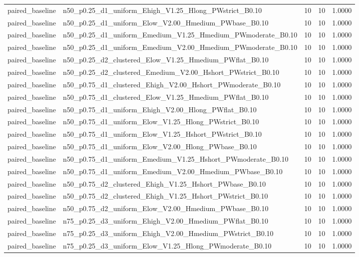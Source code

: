 \begin{tabular}{llrrr}
paired_baseline & n50_p0.25_d1_uniform_Ehigh_V1.25_Hlong_PWstrict_B0.10 & 10 & 10 & 1.0000 \\
paired_baseline & n50_p0.25_d1_uniform_Elow_V2.00_Hmedium_PWbase_B0.10 & 10 & 10 & 1.0000 \\
paired_baseline & n50_p0.25_d1_uniform_Emedium_V1.25_Hmedium_PWmoderate_B0.10 & 10 & 10 & 1.0000 \\
paired_baseline & n50_p0.25_d1_uniform_Emedium_V2.00_Hmedium_PWmoderate_B0.10 & 10 & 10 & 1.0000 \\
paired_baseline & n50_p0.25_d2_clustered_Elow_V1.25_Hmedium_PWflat_B0.10 & 10 & 10 & 1.0000 \\
paired_baseline & n50_p0.25_d2_clustered_Emedium_V2.00_Hshort_PWstrict_B0.10 & 10 & 10 & 1.0000 \\
paired_baseline & n50_p0.75_d1_clustered_Ehigh_V2.00_Hshort_PWmoderate_B0.10 & 10 & 10 & 1.0000 \\
paired_baseline & n50_p0.75_d1_clustered_Elow_V1.25_Hmedium_PWflat_B0.10 & 10 & 10 & 1.0000 \\
paired_baseline & n50_p0.75_d1_uniform_Ehigh_V2.00_Hlong_PWflat_B0.10 & 10 & 10 & 1.0000 \\
paired_baseline & n50_p0.75_d1_uniform_Elow_V1.25_Hlong_PWstrict_B0.10 & 10 & 10 & 1.0000 \\
paired_baseline & n50_p0.75_d1_uniform_Elow_V1.25_Hshort_PWstrict_B0.10 & 10 & 10 & 1.0000 \\
paired_baseline & n50_p0.75_d1_uniform_Elow_V2.00_Hlong_PWbase_B0.10 & 10 & 10 & 1.0000 \\
paired_baseline & n50_p0.75_d1_uniform_Emedium_V1.25_Hshort_PWmoderate_B0.10 & 10 & 10 & 1.0000 \\
paired_baseline & n50_p0.75_d1_uniform_Emedium_V2.00_Hmedium_PWbase_B0.10 & 10 & 10 & 1.0000 \\
paired_baseline & n50_p0.75_d2_clustered_Ehigh_V1.25_Hshort_PWbase_B0.10 & 10 & 10 & 1.0000 \\
paired_baseline & n50_p0.75_d2_clustered_Ehigh_V1.25_Hshort_PWstrict_B0.10 & 10 & 10 & 1.0000 \\
paired_baseline & n50_p0.75_d2_uniform_Elow_V2.00_Hmedium_PWbase_B0.10 & 10 & 10 & 1.0000 \\
paired_baseline & n75_p0.25_d3_uniform_Ehigh_V2.00_Hmedium_PWflat_B0.10 & 10 & 10 & 1.0000 \\
paired_baseline & n75_p0.25_d3_uniform_Ehigh_V2.00_Hmedium_PWstrict_B0.10 & 10 & 10 & 1.0000 \\
paired_baseline & n75_p0.25_d3_uniform_Elow_V1.25_Hlong_PWmoderate_B0.10 & 10 & 10 & 1.0000 \\

\end{tabular}
